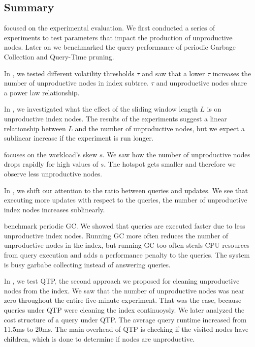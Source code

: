 \documentclass[abstracton,12pt]{scrartcl}
\theoremstyle{definition}
\begin{document}
\subsection{Summary}

\label{sec:summary}

 focused on the experimental evaluation.
We first conducted a series of experiments to test parameters that
impact the production of unproductive nodes. Later on we benchmarked the
query performance of periodic Garbage Collection and Query-Time pruning.

In , we tested different volatility thresholds $\tau$
and saw that a lower $\tau$ increases the number of unproductive nodes in
index subtree. $\tau$ and unproductive nodes share a power law relationship.

In , we investigated what the effect of the
sliding window length $L$ is on unproductive index nodes. The results
of the experiments suggest a linear relationship between $L$ and the
number of unproductive nodes, but we expect a sublinear increase if
the experiment is run longer.

 focuses on the workload's skew $s$. We saw how the
number of unproductive nodes drops rapidly for high values of $s$.
The hotspot gets smaller and therefore we observe less unproductive nodes.

In , we shift our attention to the ratio between
queries and updates. We see that executing more updates with respect
to the queries, the number of unproductive index nodes increases sublinearly.

 benchmark periodic GC. We showed
that queries are executed faster due to less unproductive index nodes.
Running GC more often reduces the number of unproductive nodes in the index,
but running GC too often steals CPU resources from query execution and
adds a performance penalty to the queries. The system is busy garbabe
collecting instead of answering queries.

In , we test QTP, the second approach we
proposed for cleaning unproductive nodes from the index. We saw that
the number of unproductive nodes was near zero throughout the entire
five-minute experiment. That was the case, because queries under
QTP were cleaning the index continuoysly. We later analyzed the
cost structure of a query under QTP. The average query runtime increased
from 11.5ms to 20ms. The main overhead of QTP is checking if the visited
nodes have children, which is done to determine if nodes are unproductive.
\end{document}
